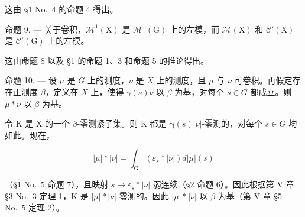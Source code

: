 这由 §1 No.~4 的命题 4 得出。

命题 9. --- 关于卷积，\(\mathcal{M}^{1}(\mathrm{X})\) 是 \(\mathcal{M}^{1}(\mathrm{G})\) 上的左模，而 \(\mathcal{M}(\mathrm{X})\) 和 \(\mathcal{C}'(\mathrm{X})\) 是 \(\mathcal{C}'(\mathrm{G})\) 上的左模。

这由命题 8 以及 §1 的命题 1、3 和命题 5 的推论得出。

命题 10. --- 设 \(\mu\) 是 \(G\) 上的测度，\(\nu\) 是 \(X\) 上的测度，且 \(\mu\) 与 \(\nu\) 可卷积。再假定存在正测度 \(\beta\)，定义在 \(X\) 上，使得 \(\gamma(s)\nu\) 以 \(\beta\) 为基，对每个 \(s \in G\) 都成立。则 \(\mu * \nu\) 以 \(\beta\) 为基。

令 K 是 X 的一个 \(\beta\)-零测紧子集。则 K 都是 \(\pmb{\gamma}(s)|\nu|\)-零测的，对每个 \(s \in G\) 均如此。现在，

\[
| \mu | * | \nu | = \int_ {\mathrm{G}} (\varepsilon_ {s} * | \nu |) d | \mu | (s)
\]

（§1 No.~5 命题 7），且映射 \(s \mapsto \varepsilon_s * |\nu|\) 弱连续（§2 命题 6）。因此根据第 V 章 §3 No.~3 定理 1，K 是 \(|\mu| * |\nu|\)-零测的。因此 \(|\mu| * |\nu|\) 以 \(\beta\) 为基（第 V 章 §5 No.~5 定理 2）。

